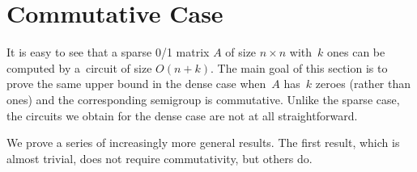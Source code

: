 \documentclass[11pt,letterpaper]{article}
\newtheorem{theorem}{Theorem}
\begin{document}

%
%
%
%
%
%

\section{Commutative Case}\label{sec-commutative}
It is easy to see that a sparse 0/1 matrix $A$ of size $n \times n$ with~$k$
ones can be computed by a~circuit of size $O(n+k)$. The main goal of this
section is to prove the same upper bound in the dense case when~$A$ has~$k$
zeroes (rather than ones) and the corresponding semigroup is commutative. Unlike
the sparse case, the circuits we obtain for the dense case are not at all
straightforward.

We prove a series of increasingly more general results. The first result, which
is almost trivial, does not require commutativity, but others do.

\end{document}
